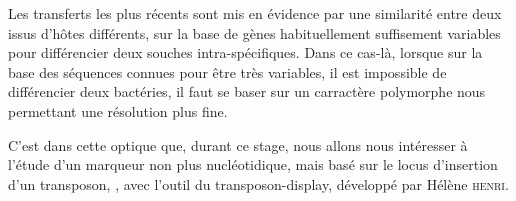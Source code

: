 Les transferts les plus récents sont mis en évidence par une similarité entre deux  issus d’hôtes différents, sur la base de gènes habituellement suffisement variables pour différencier deux souches intra-spécifiques.
Dans ce cas-là, lorsque sur la base des séquences connues pour être très variables, il est impossible de différencier deux bactéries, il faut se baser sur un carractère polymorphe nous permettant une résolution plus fine.

C’est dans cette optique que, durant ce stage, nous allons nous intéresser à l’étude  d’un marqueur non plus nucléotidique, mais basé sur le locus d’insertion d’un transposon, , avec l’outil du transposon-display, développé par Hélène \textsc{henri}\cite{memHH}.